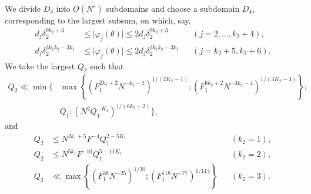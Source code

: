 \documentclass[10pt]{article}
\begin{document}
We divide $D_3$ into $O(N^\varepsilon)$ subdomains and choose a subdomain $D_4$, corresponding to the largest subsum, on which, say,
\[
\begin{aligned}
 d_j\delta_2^{9k_2+3}
 &\leqslant\lvert\varphi_j(\theta)\rvert
 \leqslant2d_j\delta_2^{9k_2+3}
 &&(j=2,\ldots,k_2+4),\\
 d_j\delta_2^{3k_1k_2-3k_1}
 &\leqslant\lvert\varphi_j(\theta)\rvert
 \leqslant2d_j\delta_2^{3k_1k_2-3k_1}
 &&(j=k_2+5,k_2+6).
\end{aligned}
\]
We take the largest $Q_2$ such that
\[
\begin{aligned}
Q_2\ll\min\Bigg\{&
 \max\left\{
  (F_1^{2k_2+2}N^{-k_2-2})^{1/(2K_2-1)};
  (F_1^{6k_2+2}N^{-3k_2-4})^{1/(3K_2-3)}
 \right\};\\
&Q_1;
 (N^2Q_1^{-K_1})^{1/(6k_2-2)}
\Bigg\},
\end{aligned}
\]
and
\[
\begin{aligned}
 Q_2&\leqslant N^{2k_1+5}F^{-4}Q_1^{2-5K_1}
 &&(k_2=1),\\
 Q_2&\leqslant N^{5k_1}F^{-10}Q_1^{5-11K_1}
 &&(k_2=2),\\
 Q_2&\ll\max\left\{
 (F_1^{38}N^{-25})^{1/30};
 (F_1^{118}N^{-77})^{1/114}
 \right\}
 &&(k_2=3).
\end{aligned}
\]
\end{document}
